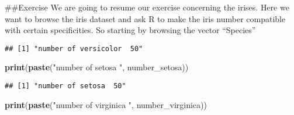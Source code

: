\documentclass[
]{article}
\newenvironment{Shaded}{\begin{snugshade}}{\end{snugshade}}
\newcommand{\ControlFlowTok}[1]{\textcolor[rgb]{0.13,0.29,0.53}{\textbf{#1}}}
\newcommand{\DecValTok}[1]{\textcolor[rgb]{0.00,0.00,0.81}{#1}}
\newcommand{\FunctionTok}[1]{\textcolor[rgb]{0.13,0.29,0.53}{\textbf{#1}}}
\newcommand{\NormalTok}[1]{#1}
\newcommand{\OtherTok}[1]{\textcolor[rgb]{0.56,0.35,0.01}{#1}}
\newcommand{\SpecialCharTok}[1]{\textcolor[rgb]{0.81,0.36,0.00}{\textbf{#1}}}
\newcommand{\StringTok}[1]{\textcolor[rgb]{0.31,0.60,0.02}{#1}}
\begin{document}
\#\#Exercise We are going to resume our exercise concerning the irises.
Here we want to browse the iris dataset and ask R to make the iris
number compatible with certain specificities. So starting by browsing
the vector ``Species''

\begin{Shaded}
\end{Shaded}

\begin{verbatim}
## [1] "number of versicolor  50"
\end{verbatim}

\begin{Shaded}
\begin{Highlighting}[]
\FunctionTok{print}\NormalTok{(}\FunctionTok{paste}\NormalTok{(}\StringTok{"number of setosa "}\NormalTok{, number\_setosa))}
\end{Highlighting}
\end{Shaded}

\begin{verbatim}
## [1] "number of setosa  50"
\end{verbatim}

\begin{Shaded}
\begin{Highlighting}[]
\FunctionTok{print}\NormalTok{(}\FunctionTok{paste}\NormalTok{(}\StringTok{"number of virginica "}\NormalTok{, number\_virginica))}
\end{Highlighting}
\end{Shaded}
\end{document}
